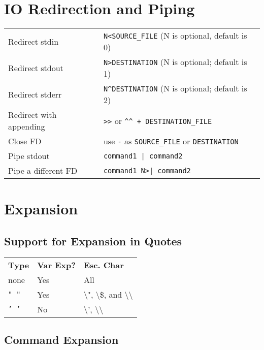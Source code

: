 \documentclass[10pt]{extarticle}
\begin{document}
\begin{paracol}{2}
\section*{IO Redirection and Piping}

\begin{tabularx}{\columnwidth}{X X}

    Redirect stdin & \texttt{N<SOURCE\_FILE} (N is optional, default is 0) \\
    Redirect stdout & \texttt{N>DESTINATION} (N is optional; default is 1) \\
    Redirect stderr & \texttt{N\^{}DESTINATION} (N is optional; default is 2) \\
    Redirect with appending & \texttt{>>} or \texttt{\^{}\^{} + DESTINATION\_FILE} \\
    Close FD & use \texttt{-} as \texttt{SOURCE\_FILE} or \texttt{DESTINATION} \\
    Pipe stdout & \texttt{command1 | command2} \\
    Pipe a different FD & \texttt{command1 N>| command2} \\

\end{tabularx}

\section*{Expansion}

\subsection*{Support for Expansion in Quotes}

\begin{tabularx}{\columnwidth}{X X X}
    \rowcolor{DarkBackground}
    \textbf{Type} & \textbf{Var Exp?} & \textbf{Esc. Char} \\
    none & Yes & All \\
    \texttt{" "} & Yes & \textbackslash", \textbackslash\$, and \textbackslash\textbackslash \\
    \texttt{' '} & No & \textbackslash', \textbackslash\textbackslash
\end{tabularx}

\subsection*{Command Expansion}


\end{paracol}
\end{document}
